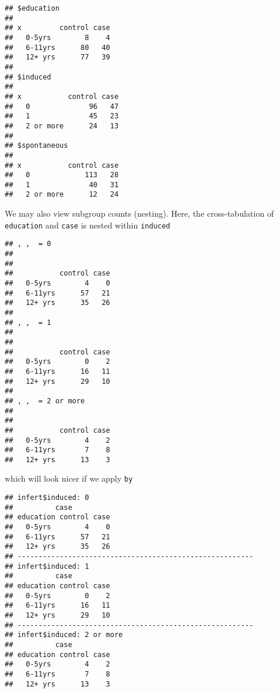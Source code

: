 \documentclass[]{book}
\newenvironment{Shaded}{\begin{snugshade}}{\end{snugshade}}
\newcommand{\KeywordTok}[1]{\textcolor[rgb]{0.13,0.29,0.53}{\textbf{{#1}}}}
\newcommand{\StringTok}[1]{\textcolor[rgb]{0.31,0.60,0.02}{{#1}}}
\newcommand{\NormalTok}[1]{{#1}}
\theoremstyle{definition}
\theoremstyle{definition}
\theoremstyle{remark}
\begin{document}
\begin{verbatim}
## $education
##          
## x         control case
##   0-5yrs        8    4
##   6-11yrs      80   40
##   12+ yrs      77   39
## 
## $induced
##            
## x           control case
##   0              96   47
##   1              45   23
##   2 or more      24   13
## 
## $spontaneous
##            
## x           control case
##   0             113   28
##   1              40   31
##   2 or more      12   24
\end{verbatim}

We may also view subgroup counts (nesting). Here, the cross-tabulation
of \texttt{education} and \texttt{case} is nested within
\texttt{induced}

\begin{Shaded}
\end{Shaded}

\begin{verbatim}
## , ,  = 0
## 
##          
##           control case
##   0-5yrs        4    0
##   6-11yrs      57   21
##   12+ yrs      35   26
## 
## , ,  = 1
## 
##          
##           control case
##   0-5yrs        0    2
##   6-11yrs      16   11
##   12+ yrs      29   10
## 
## , ,  = 2 or more
## 
##          
##           control case
##   0-5yrs        4    2
##   6-11yrs       7    8
##   12+ yrs      13    3
\end{verbatim}

which will look nicer if we apply \texttt{by}

\begin{Shaded}
\end{Shaded}

\begin{verbatim}
## infert$induced: 0
##          case
## education control case
##   0-5yrs        4    0
##   6-11yrs      57   21
##   12+ yrs      35   26
## -------------------------------------------------------- 
## infert$induced: 1
##          case
## education control case
##   0-5yrs        0    2
##   6-11yrs      16   11
##   12+ yrs      29   10
## -------------------------------------------------------- 
## infert$induced: 2 or more
##          case
## education control case
##   0-5yrs        4    2
##   6-11yrs       7    8
##   12+ yrs      13    3
\end{verbatim}
\end{document}
